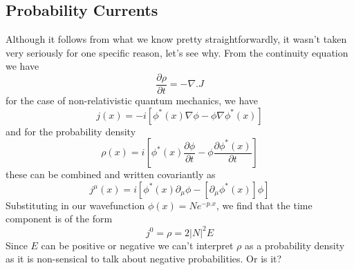 \subsection{Probability Currents}
Although it follows from what we know pretty straightforwardly, it wasn't taken very seriously for one specific reason, let's see why. From the continuity equation we have 
\begin{equation}
    \frac{\partial \rho}{\partial t} = - \nabla . J
\end{equation}
for the case of non-relativistic quantum mechanics, we have
\begin{equation}
    j(x)  = - i\left[ \phi^{*}(x) \nabla \phi - \phi \nabla \phi^{*}(x) \right]
\end{equation}
and for the probability density
\begin{equation}
    \rho(x) = i \left[ \phi^{*}(x) \frac{\partial \phi}{\partial t} - \phi \frac{\partial \phi^{*}(x)}{\partial t} \right]
\end{equation}
these can be combined and written covariantly as
\begin{equation}
    j^{\mu}(x) = i\left[ \phi^{*}(x) \partial_{\mu} \phi - [\partial_{\mu} \phi^{*}(x)]\phi \right]
\end{equation}
Substituting in our wavefunction $\phi(x) = Ne^{-p.x}$, we find that the time component is of the form
\begin{equation}
    j^{0} = \rho = 2{|N|}^{2}E
\end{equation}
Since $E$ can be positive or negative we can't interpret $\rho$ as a probability density as it is non-sensical to talk about negative probabilities. Or is it?
